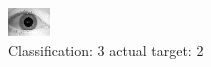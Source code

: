 \begin{figure}[h!]
\begin{center}
\includegraphics[width=0.60\columnwidth]{figures/ID1623_class_3_target_2.png}
\end{center}
\caption{ Classification: 3 actual target: 2}
\label{fig:ID1623_class_3_target_2}
\end{figure}
